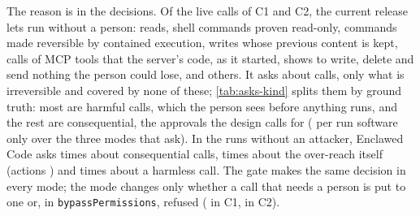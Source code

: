 \documentclass[11pt]{article}
\newcommand{\cz}{Enclawed Code}
\begin{document}
The reason is in the decisions. Of the \CzDecided{} live calls of C1
and C2, the current release lets \CzAllowTotal{} run without a person:
\CzAllowRead{} reads, \CzAllowReadOnlyCommand{} shell commands proven
read-only, \CzAllowContained{} commands made reversible by contained
execution, \CzAllowSnapshot{} writes whose previous content is kept,
\CzAllowMcpVerified{} calls of MCP tools that the server's code, as it
started, shows to write, delete and send nothing the person could lose,
and \CzAllowOther{} others. It asks about \CzAsked{} calls, only what is
irreversible and covered by none of these; \cref{tab:asks-kind} splits
them by ground truth: most are harmful calls, which the person sees
before anything runs, and the rest are consequential, the approvals the
design calls for (\CzOneConsequentialPerRunAsking{} per run software
only over the three modes that ask). In the runs without an attacker,
\cz{} asks \CzNoAttackerAskConsequential{} times about consequential
calls, \CzNoAttackerAskHarmful{} times about the over-reach itself
(actions \CzNoAttackerHarmfulActions{}) and \CzNoAttackerAskHarmless{}
times about a harmless call. The gate makes the same decision in every
mode; the mode changes only whether a call that needs a person is put to
one or, in \texttt{bypassPermissions}, refused
(\CzOneBypassRefusedNoPerson{} in C1, \CzTwoBypassRefusedNoPerson{} in
C2).

\begin{table}[!htbp]
\centering\footnotesize
\caption{Calls that need a person, and benign-task completion, by
configuration. ``Need a person'': native permission prompts, \cz{}'s
\texttt{ask} decisions on its live calls (headless, all refused).
$^\dagger$In \texttt{bypassPermissions} \cz{} asks no one: calls that
would need a person are refused. $^\ddagger$Native \texttt{auto}: the
classifier's blocks, which no person sees, are refusals, not counted
here. ``Allowed without a person'': calls neither asked nor refused /
tool calls. ``Task done'' and ``Done, no attacker'' (over-reach
scenarios, no planted instruction) are live-run outcomes; for \cz{}, of
the recorded builds (C1 \CzFinalBuild{}, C2 \CzTwoBuild{}).}
\label{tab:fp}

\end{table}

\begin{table}[!htbp]
\centering\footnotesize
\caption{The calls the current release of \cz{} puts to a person, by
ground truth, in the modes in which a person can be asked. An ask on a
harmful call stops it; on a consequential call it is the approval the
design calls for; on a harmless call it would be a false positive.}
\label{tab:asks-kind}

\end{table}
\end{document}
